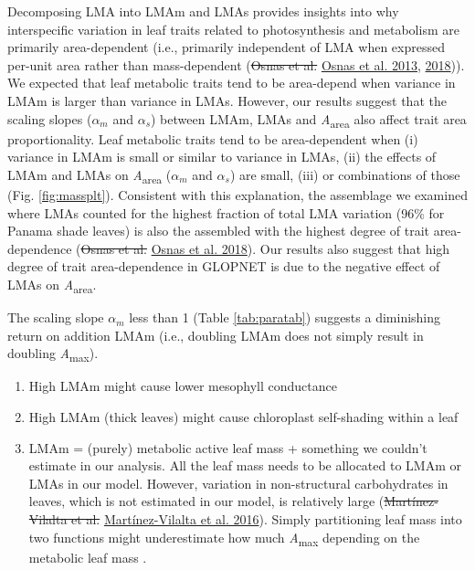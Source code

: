 \documentclass[
  12pt,
]{article}
\providecommand{\tightlist}{%
  \setlength{\itemsep}{0pt}\setlength{\parskip}{0pt}}
\providecommand{\DIFdeltex}[1]{{\protect\color{red}\sout{#1}}}                      %
\providecommand{\DIFaddbegin}{} %
\providecommand{\DIFaddend}{} %
\providecommand{\DIFdelbegin}{} %
\providecommand{\DIFdelend}{} %
\providecommand{\DIFdel}[1]{\texorpdfstring{\DIFdeltex{#1}}{}} %
\newcommand{\DIFscaledelfig}{0.5}
\newlength{\DIFdelgraphicswidth} %
\newlength{\DIFdelgraphicsheight} %
\newcommand{\DIFaddincludegraphics}[2][]{{\color{blue}\fbox{\DIFOincludegraphics[#1]{#2}}}} %
\newcommand{\DIFdelincludegraphics}[2][]{%
\sbox{\DIFdelgraphicsbox}{\DIFOincludegraphics[#1]{#2}}%
\settoboxwidth{\DIFdelgraphicswidth}{\DIFdelgraphicsbox} %
\settoboxtotalheight{\DIFdelgraphicsheight}{\DIFdelgraphicsbox} %
\scalebox{\DIFscaledelfig}{%
\parbox[b]{\DIFdelgraphicswidth}{\usebox{\DIFdelgraphicsbox}\\[-\baselineskip] \rule{\DIFdelgraphicswidth}{0em}}\llap{\resizebox{\DIFdelgraphicswidth}{\DIFdelgraphicsheight}{%
\setlength{\unitlength}{\DIFdelgraphicswidth}%
\begin{picture}(1,1)%
\thicklines\linethickness{2pt} %
{\color[rgb]{1,0,0}\put(0,0){\framebox(1,1){}}}%
{\color[rgb]{1,0,0}\put(0,0){\line( 1,1){1}}}%
{\color[rgb]{1,0,0}\put(0,1){\line(1,-1){1}}}%
\end{picture}%
}\hspace*{3pt}}} %
} %
\DeclareRobustCommand{\DIFaddbegin}{\DIFOaddbegin \let\includegraphics\DIFaddincludegraphics} %
\DeclareRobustCommand{\DIFaddend}{\DIFOaddend \let\includegraphics\DIFOincludegraphics} %
\DeclareRobustCommand{\DIFdelbegin}{\DIFOdelbegin \let\includegraphics\DIFdelincludegraphics} %
\DeclareRobustCommand{\DIFdelend}{\DIFOaddend \let\includegraphics\DIFOincludegraphics} %
\begin{document}
Decomposing LMA into LMAm and LMAs provides insights into why interspecific variation in leaf traits related to photosynthesis and metabolism are primarily area-dependent (i.e., primarily independent of LMA when expressed per-unit area rather than mass-dependent (\DIFdelbegin \DIFdel{Osnas et al. }\DIFdelend \protect\DIFdelbegin %
\DIFdelend \DIFaddbegin \hyperlink{ref-Osnas2013}{Osnas et al. 2013}\DIFaddend , \protect\hyperlink{ref-Osnas2018}{2018})).
We expected that leaf metabolic traits tend to be area-depend when variance in LMAm is larger than variance in LMAs.
However, our results suggest that the scaling slopes (\(\alpha_m\) and \(\alpha_s\)) between LMAm, LMAs and \emph{A}\textsubscript{area} also affect trait area proportionality.
Leaf metabolic traits tend to be area-dependent when (i) variance in LMAm is small or similar to variance in LMAs, (ii) the effects of LMAm and LMAs on \emph{A}\textsubscript{area} (\(\alpha_m\) and \(\alpha_s\)) are small, (iii) or combinations of those (Fig. \ref{fig:massplt}).
Consistent with this explanation, the assemblage we examined where LMAs counted for the highest fraction of total LMA variation (96\% for Panama shade leaves) is also the assembled with the highest degree of trait area-dependence (\DIFdelbegin \DIFdel{Osnas et al. }\DIFdelend \protect\DIFdelbegin %
\DIFdelend \DIFaddbegin \hyperlink{ref-Osnas2018}{Osnas et al. 2018}\DIFaddend ).
Our results also suggest that high degree of trait area-dependence in GLOPNET is due to the negative effect of LMAs on \emph{A}\textsubscript{area}.

The scaling slope \(\alpha_m\) less than 1 (Table \ref{tab:paratab}) suggests a diminishing return on addition LMAm (i.e., doubling LMAm does not simply result in doubling \emph{A}\textsubscript{max}).

\begin{enumerate}
\def\labelenumi{\arabic{enumi}.}
\tightlist
\item
  High LMAm might cause lower mesophyll conductance
\item
  High LMAm (thick leaves) might cause chloroplast self-shading within a leaf
\item
  LMAm = (purely) metabolic active leaf mass + something we couldn't estimate in our analysis. All the leaf mass needs to be allocated to LMAm or LMAs in our model. However, variation in non-structural carbohydrates in leaves, which is not estimated in our model, is relatively large (\DIFdelbegin \DIFdel{Martínez-Vilalta et al. }\DIFdelend \protect\DIFdelbegin %
\DIFdelend \DIFaddbegin \hyperlink{ref-Martinez-Vilalta2016}{Martínez-Vilalta et al. 2016}\DIFaddend ). Simply partitioning leaf mass into two functions might underestimate how much \emph{A}\textsubscript{max} depending on the metabolic leaf mass .
\end{enumerate}
\end{document}
